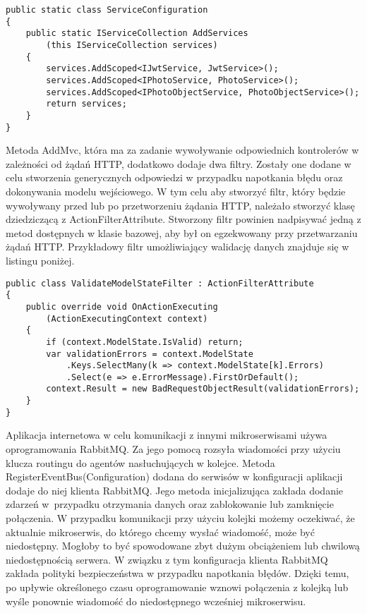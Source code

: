 \begin{lstlisting}[caption={Metoda rozszerzeń umożliwiająca dodanie serwisów do mechanizmów odwróconego sterowania.} ]
public static class ServiceConfiguration
{
	public static IServiceCollection AddServices
		(this IServiceCollection services)
	{
		services.AddScoped<IJwtService, JwtService>();
		services.AddScoped<IPhotoService, PhotoService>();
		services.AddScoped<IPhotoObjectService, PhotoObjectService>();
		return services;
	}
}
\end{lstlisting}

Metoda AddMvc, która ma za zadanie wywoływanie odpowiednich kontrolerów w zależności od żądań HTTP, dodatkowo dodaje dwa filtry. Zostały one dodane w celu stworzenia generycznych odpowiedzi w przypadku napotkania błędu oraz dokonywania modelu wejściowego. W tym celu aby stworzyć filtr, który będzie wywoływany przed lub po przetworzeniu żądania HTTP, należało stworzyć klasę dziedziczącą z ActionFilterAttribute. Stworzony filtr powinien nadpisywać jedną z metod dostępnych w klasie bazowej, aby był on egzekwowany przy przetwarzaniu żądań HTTP. Przykładowy filtr umożliwiający walidację danych znajduje się w listingu poniżej.
\newpage

\begin{lstlisting}[caption={Stworzenie obiektów odwróconego sterowania.},label={dependencyInjectionAndConfiguration} ]
 public class ValidateModelStateFilter : ActionFilterAttribute
{
	public override void OnActionExecuting
		(ActionExecutingContext context)
	{
		if (context.ModelState.IsValid) return;		
		var validationErrors = context.ModelState
			.Keys.SelectMany(k => context.ModelState[k].Errors)
			.Select(e => e.ErrorMessage).FirstOrDefault();		
		context.Result = new BadRequestObjectResult(validationErrors);
	}
}
\end{lstlisting}

Aplikacja internetowa w celu komunikacji z innymi mikroserwisami używa oprogramowania RabbitMQ. Za jego pomocą rozsyła wiadomości przy użyciu klucza routingu do agentów nasłuchujących w kolejce. Metoda RegisterEventBus(Configuration) dodana do serwisów w konfiguracji aplikacji dodaje do niej klienta RabbitMQ. Jego metoda inicjalizująca zakłada dodanie zdarzeń w~przypadku otrzymania danych oraz zablokowanie lub zamknięcie połączenia. W przypadku komunikacji przy użyciu kolejki możemy oczekiwać, że aktualnie mikroserwis, do którego chcemy wysłać wiadomość, może być niedostępny. Mogłoby to być spowodowane zbyt dużym obciążeniem lub chwilową niedostępnością serwera. W związku z tym konfiguracja klienta RabbitMQ zakłada polityki bezpieczeństwa w przypadku napotkania błędów. Dzięki temu, po upływie określonego czasu oprogramowanie wznowi połączenia z kolejką lub wyśle ponownie wiadomość do niedostępnego wcześniej mikroserwisu.


